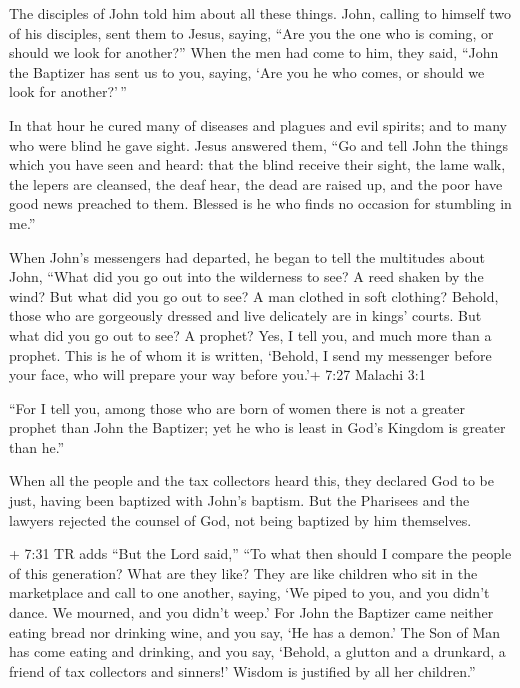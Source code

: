  The disciples of John told him about all these things.
 John, calling to himself two of his disciples, sent them
to Jesus, saying, ``Are you the one who is coming, or should we look for
another?''  When the men had come to him, they said, ``John
the Baptizer has sent us to you, saying, `Are you he who comes, or
should we look for another?'\,''

 In that hour he cured many of diseases and plagues and
evil spirits; and to many who were blind he gave sight. 
Jesus answered them, ``Go and tell John the things which you have seen
and heard: that the blind receive their sight, the lame walk, the lepers
are cleansed, the deaf hear, the dead are raised up, and the poor have
good news preached to them.  Blessed is he who finds no
occasion for stumbling in me.''

 When John's messengers had departed, he began to tell the
multitudes about John, ``What did you go out into the wilderness to see?
A reed shaken by the wind?  But what did you go out to see?
A man clothed in soft clothing? Behold, those who are gorgeously dressed
and live delicately are in kings' courts.  But what did you
go out to see? A prophet? Yes, I tell you, and much more than a prophet.
 This is he of whom it is written, `Behold, I send my
messenger before your face, who will prepare your way before you.'+ 7:27
Malachi 3:1

 ``For I tell you, among those who are born of women there
is not a greater prophet than John the Baptizer; yet he who is least in
God's Kingdom is greater than he.''

 When all the people and the tax collectors heard this,
they declared God to be just, having been baptized with John's baptism.
 But the Pharisees and the lawyers rejected the counsel of
God, not being baptized by him themselves.

 + 7:31 TR adds ``But the Lord said,'' ``To what then
should I compare the people of this generation? What are they like?
 They are like children who sit in the marketplace and call
to one another, saying, `We piped to you, and you didn't dance. We
mourned, and you didn't weep.'  For John the Baptizer came
neither eating bread nor drinking wine, and you say, `He has a demon.'
 The Son of Man has come eating and drinking, and you say,
`Behold, a glutton and a drunkard, a friend of tax collectors and
sinners!'  Wisdom is justified by all her children.''

